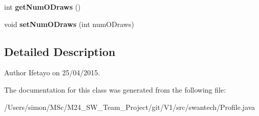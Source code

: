 \begin{DoxyCompactItemize}
\item 
\hypertarget{classswantech_1_1_profile_af864ba05f50af616c8c3efd3e6128984}{}int {\bfseries get\+Num\+O\+Draws} ()\label{classswantech_1_1_profile_af864ba05f50af616c8c3efd3e6128984}

\item 
\hypertarget{classswantech_1_1_profile_a575e52cb1943f2607fa6be763fe4ec1f}{}void {\bfseries set\+Num\+O\+Draws} (int num\+O\+Draws)\label{classswantech_1_1_profile_a575e52cb1943f2607fa6be763fe4ec1f}

\end{DoxyCompactItemize}


\subsection{Detailed Description}
\begin{DoxyAuthor}{Author}
Ifetayo on 25/04/2015. 
\end{DoxyAuthor}


The documentation for this class was generated from the following file\+:\begin{DoxyCompactItemize}
\item 
/\+Users/simon/\+M\+Sc/\+M24\+\_\+\+S\+W\+\_\+\+Team\+\_\+\+Project/git/\+V1/src/swantech/Profile.\+java\end{DoxyCompactItemize}
